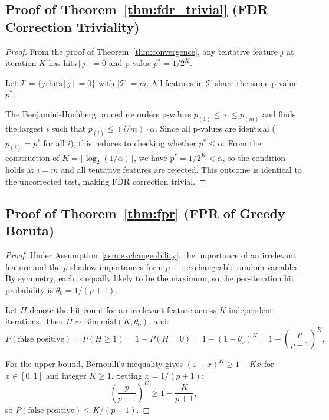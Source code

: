 \documentclass[runningheads]{llncs}
\begin{document}
\subsection{Proof of Theorem~\ref{thm:fdr_trivial} (FDR Correction Triviality)}

\begin{proof}
From the proof of Theorem~\ref{thm:convergence}, any tentative feature $j$ at iteration $K$ has $\text{hits}[j] = 0$ and p-value $p^* = 1/2^K$.

Let $\mathcal{T} = \{j : \text{hits}[j] = 0\}$ with $|\mathcal{T}| = m$. All features in $\mathcal{T}$ share the same p-value $p^*$.

The Benjamini-Hochberg procedure orders p-values $p_{(1)} \leq \cdots \leq p_{(m)}$ and finds the largest $i$ such that $p_{(i)} \leq (i/m) \cdot \alpha$. Since all p-values are identical ($p_{(i)} = p^*$ for all $i$), this reduces to checking whether $p^* \leq \alpha$. From the construction of $K = \lceil \log_2(1/\alpha) \rceil$, we have $p^* = 1/2^K < \alpha$, so the condition holds at $i = m$ and all tentative features are rejected. This outcome is identical to the uncorrected test, making FDR correction trivial.
\end{proof}

\subsection{Proof of Theorem~\ref{thm:fpr} (FPR of Greedy Boruta)}

\begin{proof}
Under Assumption~\ref{asm:exchangeability}, the importance of an irrelevant feature and the $p$ shadow importances form $p+1$ exchangeable random variables. By symmetry, each is equally likely to be the maximum, so the per-iteration hit probability is $\theta_0 = 1/(p+1)$.

Let $H$ denote the hit count for an irrelevant feature across $K$ independent iterations. Then $H \sim \mathrm{Binomial}(K, \theta_0)$, and:
\[
P(\text{false positive}) = P(H \geq 1) = 1 - P(H = 0) = 1 - (1 - \theta_0)^K = 1 - \left(\frac{p}{p+1}\right)^K.
\]

For the upper bound, Bernoulli's inequality gives $(1 - x)^K \geq 1 - Kx$ for $x \in [0,1]$ and integer $K \geq 1$. Setting $x = 1/(p+1)$:
\[
\left(\frac{p}{p+1}\right)^K \geq 1 - \frac{K}{p+1},
\]
so $P(\text{false positive}) \leq K/(p+1)$.
\end{proof}
\end{document}
